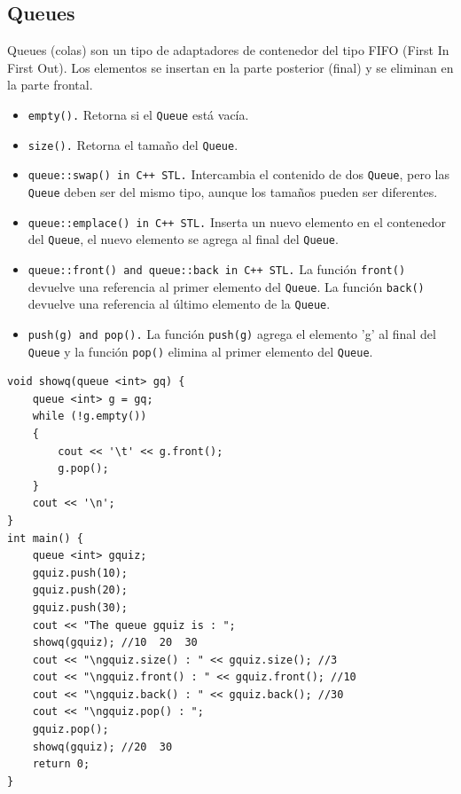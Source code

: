 \documentclass[a4paper,12pt]{article}
\begin{document}
\subsection*{Queues}
Queues (colas) son un tipo de adaptadores de contenedor del tipo FIFO (First In First Out). Los elementos se insertan en la parte posterior (final) y se eliminan en la parte frontal.
\begin{itemize}
\item \texttt{empty().} Retorna si el \texttt{Queue} está vacía.
\item \texttt{size().} Retorna el tamaño del \texttt{Queue}.
\item \texttt{queue::swap() in C++ STL.} Intercambia el contenido de dos \texttt{Queue}, pero las \texttt{Queue} deben ser del mismo tipo, aunque los tamaños pueden ser diferentes.
\item \texttt{queue::emplace() in C++ STL.} Inserta un nuevo elemento en el contenedor del \texttt{Queue}, el nuevo elemento se agrega al final del \texttt{Queue}.
\item \texttt{queue::front() and queue::back in C++ STL.} La función \texttt{front()} devuelve una referencia al primer elemento del \texttt{Queue}. La función \texttt{back()} devuelve una referencia al último elemento de la \texttt{Queue}.
\item \texttt{push(g) and pop().} La función \texttt{push(g)} agrega el elemento 'g' al final del \texttt{Queue} y la función \texttt{pop()} elimina al primer elemento del \texttt{Queue}.
\end{itemize}
\begin{lstlisting}
void showq(queue <int> gq) { 
    queue <int> g = gq; 
    while (!g.empty()) 
    { 
        cout << '\t' << g.front(); 
        g.pop(); 
    } 
    cout << '\n'; 
}
int main() { 
    queue <int> gquiz; 
    gquiz.push(10); 
    gquiz.push(20); 
    gquiz.push(30); 
    cout << "The queue gquiz is : ";
    showq(gquiz); //10  20  30
    cout << "\ngquiz.size() : " << gquiz.size(); //3
    cout << "\ngquiz.front() : " << gquiz.front(); //10
    cout << "\ngquiz.back() : " << gquiz.back(); //30
    cout << "\ngquiz.pop() : ";
    gquiz.pop();
    showq(gquiz); //20  30
    return 0; 
} 
\end{lstlisting}
\end{document}
